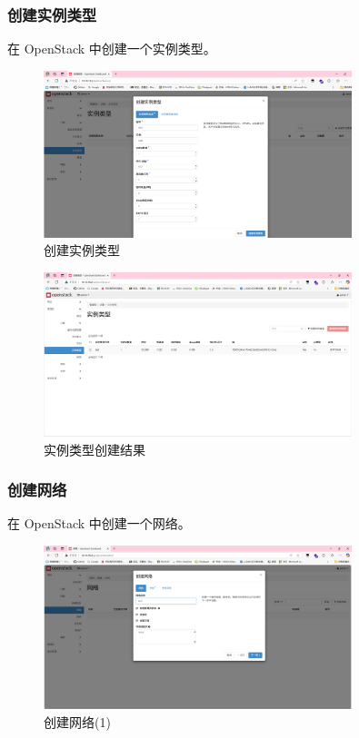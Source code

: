 \documentclass{article}
\begin{document}
\subsubsection{创建实例类型}

在 OpenStack 中创建一个实例类型。

\begin{figure}[H]
    \centering
    \includegraphics[width=0.8\textwidth]{img/9.1.png}
    \caption{创建实例类型}
\end{figure}

\begin{figure}[H]
    \centering
    \includegraphics[width=0.8\textwidth]{img/9.2.png}
    \caption{实例类型创建结果}
\end{figure}

\subsubsection{创建网络}

在 OpenStack 中创建一个网络。

\begin{figure}[H]
    \centering
    \includegraphics[width=0.8\textwidth]{img/10.1.png}
    \caption{创建网络(1)}
\end{figure}
\end{document}
